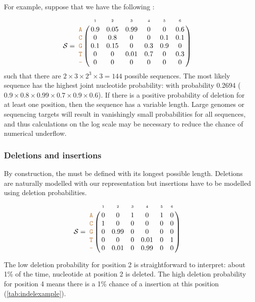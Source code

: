 \documentclass[10pt]{article}
\begin{document}
For example, suppose that we have the following \nlps:
$$
\nps = 
\bordermatrix{
& \scriptscriptstyle{1} & \scriptscriptstyle{2}& \scriptscriptstyle{3}& \scriptscriptstyle{4} & \scriptscriptstyle{5} & \scriptscriptstyle{6} \cr
\sq{A} & 0.9 & 0.05   & 0.99 & 0 & 0 & 0.6\cr
\sq{C} & 0   & 0.8 & 0 & 0 & 0.1 & 0.1\cr
\sq{G} & 0.1 & 0.15 & 0 & 0.3 & 0.9 & 0\cr
\sq{T} & 0 & 0 & 0.01 & 0.7 & 0 & 0.3\cr
\sq{-} & 0 & 0 & 0 & 0 & 0 & 0\cr
}
$$
such that there are $2\times 3 \times 2^3 \times 3 = 144$ possible sequences.
The most likely sequence has the highest joint nucleotide probability:  with probability 0.2694 ($0.9\times 0.8\times 0.99 \times 0.7 \times 0.9 \times 0.6$).
If there is a positive probability of deletion for at least one position, then the sequence has a variable length.
Large genomes or sequencing targets will result in vanishingly small probabilities for all sequences, and thus calculations on the log scale may be necessary to reduce the chance of numerical underflow.



\subsubsection{Deletions and insertions}

By construction, the \nlps must be defined with its longest possible length.
Deletions are naturally modelled with our representation but insertions have to be modelled using deletion probabilities. 
\begin{equation}
\label{eq:indel}
\nps = 
\bordermatrix{
&\scriptscriptstyle{1} & \scriptscriptstyle{2}& \scriptscriptstyle{3}& \scriptscriptstyle{4} & \scriptscriptstyle{5} & \scriptscriptstyle{6} \cr
\sq{A} & 0 & 0   & 1 & 0    & 1 & 0\cr
\sq{C} & 1 & 0    & 0 & 0    & 0 & 0\cr
\sq{G} & 0 & 0.99 & 0 & 0    & 0 & 0\cr
\sq{T} & 0 & 0    & 0 & 0.01 & 0 & 1\cr
\sq{-} & 0 & 0.01 & 0 & 0.99 & 0 & 0\cr
}
\end{equation}

The low deletion probability for position 2 is straightforward to interpret: about 1\% of the time, nucleotide  at position 2 is deleted.
The high deletion probability for position 4 means there is a 1\% chance of a  insertion at this position (\autoref{tab:indelexample}).
\end{document}

